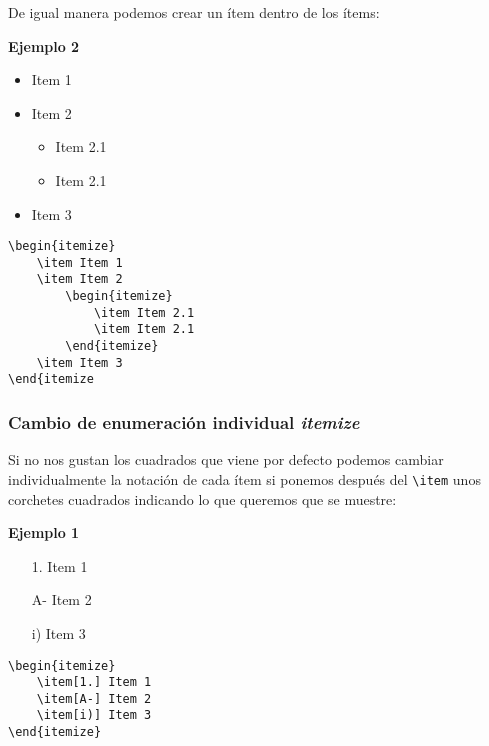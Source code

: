 	
	De igual manera podemos crear un ítem dentro de los ítems:
	
	\textbf{Ejemplo 2}
	
	\begin{itemize}
		\item Item 1
		\item Item 2		
		\begin{itemize}
			\item Item 2.1
			\item Item 2.1
		\end{itemize}		
		\item Item 3
	\end{itemize}
	

	\begin{myquote}
		\begin{lstlisting}
\begin{itemize}
	\item Item 1
	\item Item 2		
		\begin{itemize}
			\item Item 2.1
			\item Item 2.1
		\end{itemize}
	\item Item 3
\end{itemize
		\end{lstlisting}
	\end{myquote}
	
	
	\subsubsection{Cambio de enumeración individual \textsl{itemize}}
	
	Si no nos gustan los cuadrados que viene por defecto podemos cambiar individualmente la notación de cada ítem si ponemos después del \verb|\item| unos corchetes cuadrados indicando lo que queremos que se muestre:
	
	\textbf{Ejemplo 1}
		
	\begin{itemize}
		\item[1.] Item 1
		\item[A-] Item 2
		\item[i)] Item 3
	\end{itemize}
	
	\begin{myquote}
		\begin{lstlisting}
\begin{itemize}
	\item[1.] Item 1
	\item[A-] Item 2
	\item[i)] Item 3
\end{itemize}
		\end{lstlisting}
	\end{myquote}
	
